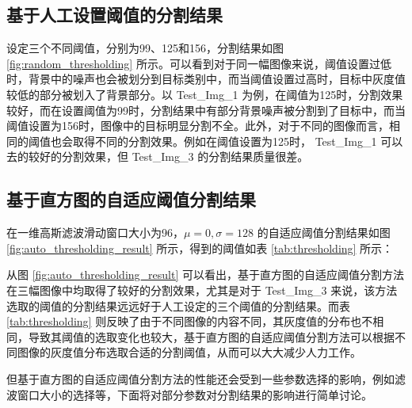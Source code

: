 \subsection{基于人工设置阈值的分割结果}

设定三个不同阈值，分别为99、125和156，分割结果如图 \ref{fig:random_thresholding} 所示。可以看到对于同一幅图像来说，阈值设置过低时，背景中的噪声也会被划分到目标类别中，而当阈值设置过高时，目标中灰度值较低的部分被划入了背景部分。以 Test\_Img\_1 为例，在阈值为125时，分割效果较好，而在设置阈值为99时，分割结果中有部分背景噪声被分割到了目标中，而当阈值设置为156时，图像中的目标明显分割不全。此外，对于不同的图像而言，相同的阈值也会取得不同的分割效果。例如在阈值设置为125时， Test\_Img\_1 可以去的较好的分割效果，但 Test\_Img\_3 的分割结果质量很差。

\subsection{基于直方图的自适应阈值分割结果}

在一维高斯滤波滑动窗口大小为96，$\mu=0,\sigma=128$ 的自适应阈值分割结果如图 \ref{fig:auto_thresholding_result} 所示，得到的阈值如表 \ref{tab:thresholding} 所示：

\begin{table}[!ht]
\vspace{0.03cm}
\caption{基于直方图的自适应阈值分割方法阈值表}
\label{tab:thresholding}
\end{table}

从图 \ref{fig:auto_thresholding_result} 可以看出，基于直方图的自适应阈值分割方法在三幅图像中均取得了较好的分割效果，尤其是对于 Test\_Img\_3 来说，该方法选取的阈值的分割结果远远好于人工设定的三个阈值的分割结果。而表  \ref{tab:thresholding} 则反映了由于不同图像的内容不同，其灰度值的分布也不相同，导致其阈值的选取变化也较大，基于直方图的自适应阈值分割方法可以根据不同图像的灰度值分布选取合适的分割阈值，从而可以大大减少人力工作。


但基于直方图的自适应阈值分割方法的性能还会受到一些参数选择的影响，例如滤波窗口大小的选择等，下面将对部分参数对分割结果的影响进行简单讨论。

